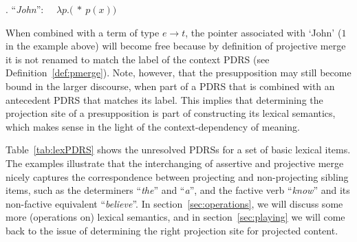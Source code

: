 \ex. ``\textit{John}'':~~ 
  $\lambda p.($$~*~p(x))$

When combined with a term of type $e\rightarrow t$, the pointer associated
with `John' ($1$ in the example above) will become free because by
definition of projective merge it is not renamed to match the label of the
context PDRS (see Definition~\ref{def:pmerge}). Note, however, that the
presupposition may still become bound in the larger discourse, when part of
a PDRS that is combined with an antecedent PDRS that matches its label. This
implies that determining the projection site of a presupposition is part of
constructing its lexical semantics, which makes sense in the light of the
context-dependency of meaning. 

Table~\ref{tab:lexPDRS} shows the unresolved PDRSs for a set of basic
lexical items. The examples illustrate that the interchanging of assertive
and projective merge nicely captures the correspondence between projecting
and non-projecting sibling items, such as the determiners ``\textit{the}''
and ``\textit{a}'', and the factive verb ``\textit{know}'' and its
non-factive equivalent ``\textit{believe}''. In
section~\ref{sec:operations}, we will discuss some more (operations on)
lexical semantics, and in section~\ref{sec:playing} we will come back to the
issue of determining the right projection site for projected content.

